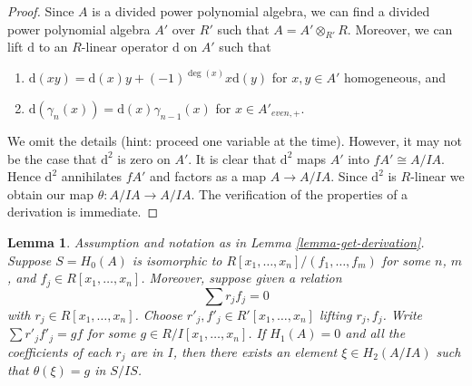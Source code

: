 \documentclass{stacks-project}
\theoremstyle{plain}
\newtheorem{lemma}[subsection]{Lemma}
\theoremstyle{definition}
\theoremstyle{remark}
\numberwithin{equation}{subsection}
\begin{document}
\begin{proof}
Since $A$ is a divided power polynomial algebra, we can find a divided
power polynomial algebra $A'$ over $R'$ such that $A = A' \otimes_{R'} R$.
Moreover, we can lift $\text{d}$ to an $R$-linear
operator $\text{d}$ on $A'$ such that
\begin{enumerate}
\item  $\text{d}(xy) = \text{d}(x)y + (-1)^{\deg(x)}x \text{d}(y)$
for $x, y \in A'$ homogeneous, and
\item  $\text{d}(\gamma_n(x)) = \text{d}(x) \gamma_{n - 1}(x)$ for
$x \in A'_{even, +}$.
\end{enumerate}
We omit the details (hint: proceed one variable at the time).
However, it may not be the case that $\text{d}^2$
is zero on $A'$. It is clear that $\text{d}^2$ maps $A'$ into
$fA' \cong A/IA$. Hence $\text{d}^2$ annihilates $fA'$ and factors
as a map $A \to A/IA$. Since $\text{d}^2$ is $R$-linear we obtain
our map $\theta : A/IA \to A/IA$. The verification of the properties
of a derivation is immediate.
\end{proof}

\begin{lemma}
\label{lemma-compute-theta}
Assumption and notation as in Lemma \ref{lemma-get-derivation}.
Suppose $S = H_0(A)$ is isomorphic to
$R[x_1, \ldots, x_n]/(f_1, \ldots, f_m)$
for some $n$, $m$, and $f_j \in R[x_1, \ldots, x_n]$.
Moreover, suppose given a relation
$$
\sum r_j f_j = 0
$$
with $r_j \in R[x_1, \ldots, x_n]$.
Choose $r'_j, f'_j \in R'[x_1, \ldots, x_n]$ lifting $r_j, f_j$.
Write $\sum r'_j f'_j = gf$ for some $g \in R/I[x_1, \ldots, x_n]$.
If $H_1(A) = 0$ and all the coefficients of each $r_j$ are in $I$, then
there exists an element $\xi \in H_2(A/IA)$ such that
$\theta(\xi) = g$ in $S/IS$.
\end{lemma}
\end{document}
